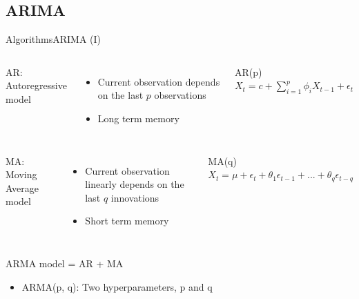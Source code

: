 \documentclass[10pt,compress]{beamer} %
\begin{document}
\subsection{ARIMA}
\begin{frame}{Algorithms}{ARIMA (I)}
    \begin{columns}
	   AR: Autoregressive model
	    \begin{itemize}
		\item Current observation depends on the last $p$ observations
		\item Long term memory
	    \end{itemize}

		\begin{block}{AR(p)}
			$X_t = c+\sum_{i=1}^p \phi_i X_{t-1}+\epsilon_t$
        	\end{block}
    \end{columns}

    \smallskip

    \begin{columns}
	   MA: Moving Average model
	    \begin{itemize}
		\item Current observation linearly depends on the last $q$ innovations
		\item Short term memory
	    \end{itemize}

		\begin{block}{MA(q)}
			$X_t =  \mu + \epsilon_t + \theta_1 \epsilon_{t-1} + ... + \theta_q \epsilon_{t-q}$
        	\end{block}
    \end{columns}

    \bigskip

    ARMA model = AR + MA
	\begin{itemize}
		\item ARMA(p, q): Two hyperparameters, p and q
	\end{itemize}

\end{frame}
\end{document}
